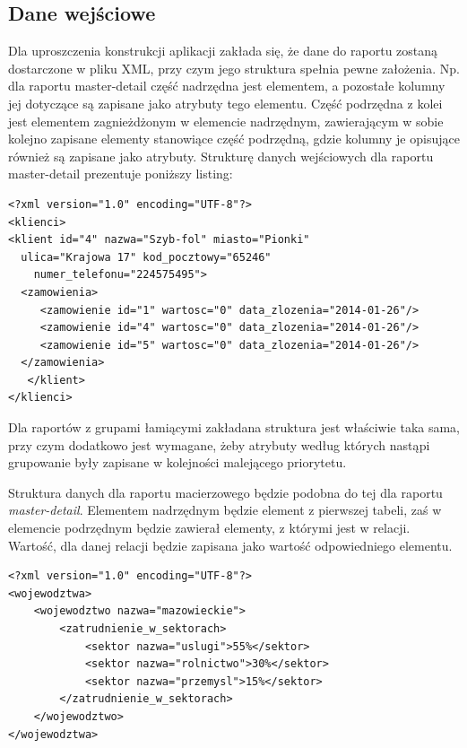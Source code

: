 \documentclass[11pt,a4paper]{article}
\begin{document}
\subsection{Dane wejściowe}\label{sec:appDane}
Dla uproszczenia konstrukcji aplikacji zakłada się, że dane do raportu zostaną dostarczone w pliku XML, przy czym jego struktura spełnia pewne założenia. Np. dla raportu master-detail część nadrzędna jest elementem, a pozostałe kolumny jej dotyczące są zapisane jako atrybuty tego elementu. Część podrzędna z kolei jest elementem zagnieżdżonym w elemencie nadrzędnym, zawierającym w sobie kolejno zapisane elementy stanowiące część podrzędną, gdzie kolumny je opisujące również są zapisane jako atrybuty. Strukturę danych wejściowych dla raportu master-detail prezentuje poniższy listing:\\
\lstset{language=XML}
\begin{lstlisting}[frame=single,caption=Zakładana struktura pliku z danymi wejściowymi dla raportu master-detail,label=strukturaDanychMD]
<?xml version="1.0" encoding="UTF-8"?>
<klienci>
<klient id="4" nazwa="Szyb-fol" miasto="Pionki" 
  ulica="Krajowa 17" kod_pocztowy="65246" 
    numer_telefonu="224575495">
  <zamowienia>
     <zamowienie id="1" wartosc="0" data_zlozenia="2014-01-26"/>
     <zamowienie id="4" wartosc="0" data_zlozenia="2014-01-26"/>
     <zamowienie id="5" wartosc="0" data_zlozenia="2014-01-26"/>
  </zamowienia>
   </klient>	
</klienci>

\end{lstlisting}
Dla raportów z grupami łamiącymi zakładana struktura jest właściwie taka sama, przy czym dodatkowo jest wymagane, żeby atrybuty według których nastąpi grupowanie były zapisane w kolejności malejącego priorytetu.

Struktura danych dla raportu macierzowego będzie podobna do tej dla raportu \emph{master-detail}. Elementem nadrzędnym będzie element z pierwszej tabeli, zaś w elemencie podrzędnym będzie zawierał elementy, z którymi jest w relacji. Wartość, dla danej relacji będzie zapisana jako wartość odpowiedniego elementu.

\lstset{language=XML}
\begin{lstlisting}[frame=single,caption=Zakładana struktura pliku z danymi wejściowymi dla raportu macierzowego,label=strukturaDanychMAtrix]
<?xml version="1.0" encoding="UTF-8"?>
<wojewodztwa>
	<wojewodztwo nazwa="mazowieckie">
		<zatrudnienie_w_sektorach>
			<sektor nazwa="uslugi">55%</sektor>
			<sektor nazwa="rolnictwo">30%</sektor>
			<sektor nazwa="przemysl">15%</sektor>		
		</zatrudnienie_w_sektorach>	
	</wojewodztwo>
</wojewodztwa>
\end{lstlisting}
\end{document}
